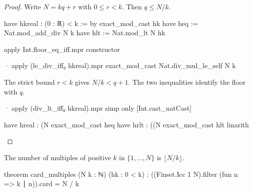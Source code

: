 \begin{proof}
  Write $N=kq+r$ with $0\le r<k$.
  Then $q\le N/k$.

  \begin{lean}
    have hkreal : (0 : ℝ) < k := by
      exact_mod_cast hk
    have heq := Nat.mod_add_div N k
    have hlt := Nat.mod_lt N hk

    apply Int.floor_eq_iff.mpr
    constructor

    · apply (le_div_iff₀ hkreal).mpr
      exact_mod_cast Nat.div_mul_le_self N k
  \end{lean}

  The strict bound $r<k$ gives $N/k<q+1$.
  The two inequalities identify the floor with $q$.

  \begin{lean}
    · apply (div_lt_iff₀ hkreal).mpr
      simp only [Int.cast_natCast]

      have hreal : (N %
        exact_mod_cast heq
      have hrlt : ((N %
        exact_mod_cast hlt
      linarith
  \end{lean}
\end{proof}

\begin{theorem}
  \label{ent:thm:card-multiples}
  The number of multiples of positive $k$ in $\{1,\ldots,N\}$ is $\lfloor N/k\rfloor$.

  \begin{lean}
    theorem card_multiples (N k : ℕ) (hk : 0 < k) :
        ((Finset.Icc 1 N).filter (fun n => k ∣ n)).card = N / k
  \end{lean}
\end{theorem}

